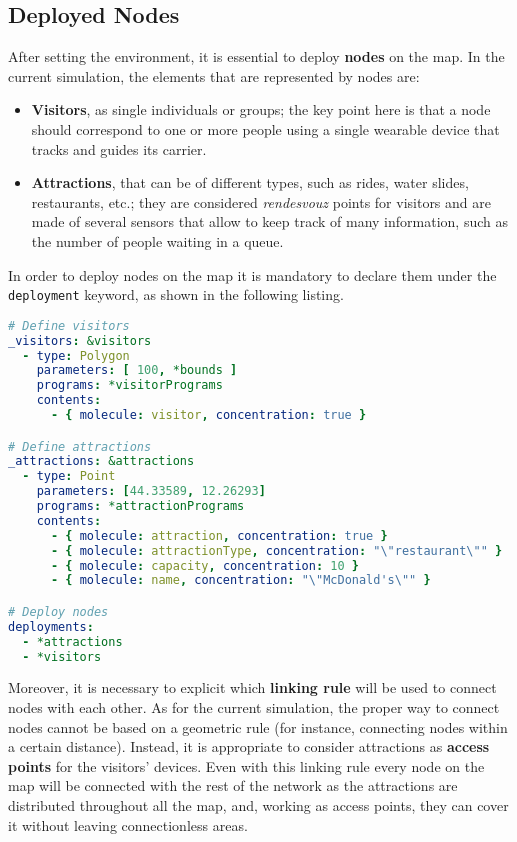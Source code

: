 \subsection{Deployed Nodes}
After setting the environment, it is essential to deploy \textbf{nodes} on the map. In the current simulation, the elements that are represented by nodes are:
\begin{itemize}
    \item \textbf{Visitors}, as single individuals or groups; the key point here is that a node should correspond to one or more people using a single wearable device that tracks and guides its carrier.
    \item \textbf{Attractions}, that can be of different types, such as rides, water slides, restaurants, etc.; they are considered \textit{rendesvouz} points for visitors and are made of several sensors that allow to keep track of many information, such as the number of people waiting in a queue.
\end{itemize}

\noindent
In order to deploy nodes on the map it is mandatory to declare them under the \texttt{deployment} keyword, as shown in the following listing.

\begin{lstlisting}[language=yaml, label=code:deployment, caption=Deploying 1 attraction and 100 visitors inside the \texttt{bounds} polygon.]
# Define visitors
_visitors: &visitors
  - type: Polygon
    parameters: [ 100, *bounds ]
    programs: *visitorPrograms
    contents:
      - { molecule: visitor, concentration: true }

# Define attractions
_attractions: &attractions
  - type: Point
    parameters: [44.33589, 12.26293]
    programs: *attractionPrograms
    contents:
      - { molecule: attraction, concentration: true }
      - { molecule: attractionType, concentration: "\"restaurant\"" }
      - { molecule: capacity, concentration: 10 }
      - { molecule: name, concentration: "\"McDonald's\"" }

# Deploy nodes
deployments:
  - *attractions
  - *visitors
\end{lstlisting}

\noindent
Moreover, it is necessary to explicit which \textbf{linking rule} will be used to connect nodes with each other. As for the current simulation, the proper way to connect nodes cannot be based on a geometric rule (for instance, connecting nodes within a certain distance). Instead, it is appropriate to consider attractions as \textbf{access points} for the visitors' devices. Even with this linking rule every node on the map will be connected with the rest of the network as the attractions are distributed throughout all the map, and, working as access points, they can cover it without leaving connectionless areas.

